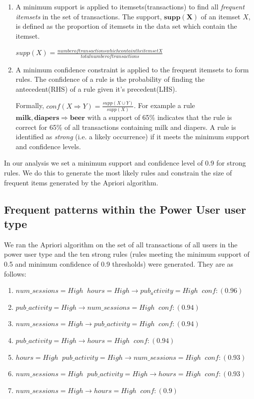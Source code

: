 \documentclass{acm_proc_article-sp}
\begin{document}
\begin{enumerate}
\item A minimum support is applied to itemsets(transactions) to find all \textit{frequent itemsets} in the set of transactions.
The support, $\mathbf{supp(X)}$ of an itemset $X$, is defined as the proportion of itemsets in the data set which contain the 
itemset.



$supp\left(X\right) = \frac{number of transactions which contain the itemset X}{total number of transactions}$



\item A minimum confidence constraint is applied to the frequent itemsets to form rules. The confidence of a rule is the probability of finding the antecedent(RHS) of a rule given it's precedent(LHS).

Formally, $conf(X \Longrightarrow Y) = \frac{supp\left(X \cup Y\right)}{supp\left(X\right)}$. 
For example a rule $\mathbf{milk,diapers \Longrightarrow {beer}}$ with a support of 65\% indicates that the rule is correct for 65\% of all transactions containing milk and diapers.
 A rule is identified as \textit{strong} (i.e. a likely occurrence) if it meets the minimum support and confidence levels.
\end{enumerate}

In our analysis we set a minimum support and confidence level of 0.9 for strong rules. We do this to generate the most likely rules and constrain the size of frequent items generated by the Apriori algorithm.

\subsection {Frequent patterns within the Power User user type}
We ran the Apriori algorithm on the set of all transactions of all users in the power user type and the ten strong rules (rules meeting the minimum support of 0.5 and minimum confidence of 0.9 thresholds) were generated. They are as follows:

\begin{enumerate}
 \item $num\_sessions=High \;\; hours=High \longrightarrow pub_activity=High   \;\;conf:(0.96)$
 \item $pub\_activity=High \longrightarrow num\_sessions=High  \;\;  conf:(0.94)$
 \item $num\_sessions=High \longrightarrow pub\_activity=High   \;\; conf:(0.94)$
 \item $pub\_activity=High \longrightarrow hours=High  \;\;  conf:(0.94)$
 \item $hours=High \;\; pub\_activity=High \longrightarrow num\_sessions=High  \;\; conf:(0.93)$
 \item $num\_sessions=High \;\; pub\_activity=High \longrightarrow hours=High   \;\;conf:(0.93)$
 \item $num\_sessions=High  \longrightarrow hours=High \;\;  conf:(0.9)$
\end{enumerate}
\end{document}
